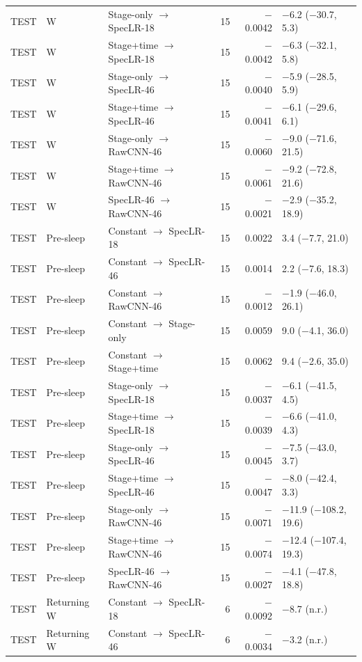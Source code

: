 {{\begin{longtable}{@{}lllrrl@{}}
TEST & W & Stage-only $\to$ SpecLR-18 & 15 & $-$0.0042 & $-$6.2 ($-$30.7, 5.3) \\
TEST & W & Stage+time $\to$ SpecLR-18 & 15 & $-$0.0042 & $-$6.3 ($-$32.1, 5.8) \\
TEST & W & Stage-only $\to$ SpecLR-46 & 15 & $-$0.0040 & $-$5.9 ($-$28.5, 5.9) \\
TEST & W & Stage+time $\to$ SpecLR-46 & 15 & $-$0.0041 & $-$6.1 ($-$29.6, 6.1) \\
TEST & W & Stage-only $\to$ RawCNN-46 & 15 & $-$0.0060 & $-$9.0 ($-$71.6, 21.5) \\
TEST & W & Stage+time $\to$ RawCNN-46 & 15 & $-$0.0061 & $-$9.2 ($-$72.8, 21.6) \\
TEST & W & SpecLR-46 $\to$ RawCNN-46 & 15 & $-$0.0021 & $-$2.9 ($-$35.2, 18.9) \\
\addlinespace[1pt]
TEST & Pre-sleep & Constant $\to$ SpecLR-18 & 15 & 0.0022 & 3.4 ($-$7.7, 21.0) \\
TEST & Pre-sleep & Constant $\to$ SpecLR-46 & 15 & 0.0014 & 2.2 ($-$7.6, 18.3) \\
TEST & Pre-sleep & Constant $\to$ RawCNN-46 & 15 & $-$0.0012 & $-$1.9 ($-$46.0, 26.1) \\
TEST & Pre-sleep & Constant $\to$ Stage-only & 15 & 0.0059 & 9.0 ($-$4.1, 36.0) \\
TEST & Pre-sleep & Constant $\to$ Stage+time & 15 & 0.0062 & 9.4 ($-$2.6, 35.0) \\
TEST & Pre-sleep & Stage-only $\to$ SpecLR-18 & 15 & $-$0.0037 & $-$6.1 ($-$41.5, 4.5) \\
TEST & Pre-sleep & Stage+time $\to$ SpecLR-18 & 15 & $-$0.0039 & $-$6.6 ($-$41.0, 4.3) \\
TEST & Pre-sleep & Stage-only $\to$ SpecLR-46 & 15 & $-$0.0045 & $-$7.5 ($-$43.0, 3.7) \\
TEST & Pre-sleep & Stage+time $\to$ SpecLR-46 & 15 & $-$0.0047 & $-$8.0 ($-$42.4, 3.3) \\
TEST & Pre-sleep & Stage-only $\to$ RawCNN-46 & 15 & $-$0.0071 & $-$11.9 ($-$108.2, 19.6) \\
TEST & Pre-sleep & Stage+time $\to$ RawCNN-46 & 15 & $-$0.0074 & $-$12.4 ($-$107.4, 19.3) \\
TEST & Pre-sleep & SpecLR-46 $\to$ RawCNN-46 & 15 & $-$0.0027 & $-$4.1 ($-$47.8, 18.8) \\
\addlinespace[1pt]
TEST & Returning W & Constant $\to$ SpecLR-18 & 6 & $-$0.0092 & $-$8.7 (n.r.) \\
TEST & Returning W & Constant $\to$ SpecLR-46 & 6 & $-$0.0034 & $-$3.2 (n.r.) \\

\end{longtable}}}
